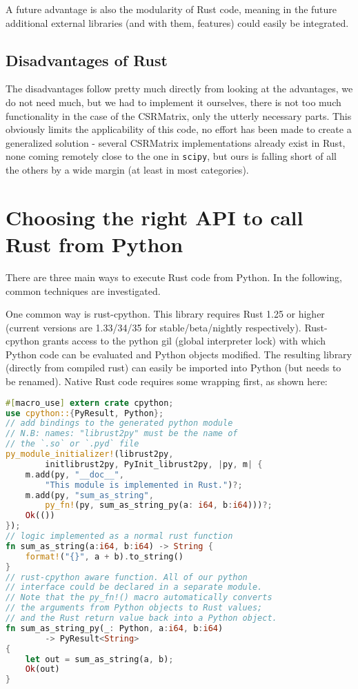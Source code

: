 A future advantage is also the modularity of Rust code, meaning in the future
additional external libraries (and with them, features) could easily be integrated.

\subsection{Disadvantages of Rust}

The disadvantages follow pretty much directly from looking at the advantages,
we do not need much, but we had to implement it ourselves, there is not
too much functionality in the case of the CSRMatrix, only the utterly necessary
parts. This obviously limits the applicability of this code, no effort has been
made to create a generalized solution - several CSRMatrix implementations
already exist in Rust, none coming remotely close to the one in \verb|scipy|,
but ours is falling short of all the others by a wide margin (at least in most
categories).



\section{Choosing the right API to call Rust from Python}\label{sec:api}

There are three main ways to execute Rust code from Python. In the following, common techniques are investigated.

One common way is rust-cpython. This library requires Rust 1.25 or higher
(current versions are 1.33/34/35 for stable/beta/nightly respectively).
Rust-cpython grants access to the python gil (global interpreter lock) with
which Python code can be evaluated and Python objects modified. The resulting
library (directly from compiled rust) can easily be imported into Python (but
needs to be renamed). Native Rust code requires some wrapping first, as shown
here:

\vline
\begin{lstlisting}[language=Rust]
#[macro_use] extern crate cpython;
use cpython::{PyResult, Python};
// add bindings to the generated python module
// N.B: names: "librust2py" must be the name of
// the `.so` or `.pyd` file
py_module_initializer!(librust2py,
        initlibrust2py, PyInit_librust2py, |py, m| {
    m.add(py, "__doc__",
        "This module is implemented in Rust.")?;
    m.add(py, "sum_as_string",
        py_fn!(py, sum_as_string_py(a: i64, b:i64)))?;
    Ok(())
});
// logic implemented as a normal rust function
fn sum_as_string(a:i64, b:i64) -> String {
    format!("{}", a + b).to_string()
}
// rust-cpython aware function. All of our python
// interface could be declared in a separate module.
// Note that the py_fn!() macro automatically converts
// the arguments from Python objects to Rust values;
// and the Rust return value back into a Python object.
fn sum_as_string_py(_: Python, a:i64, b:i64)
        -> PyResult<String>
{
    let out = sum_as_string(a, b);
    Ok(out)
}
\end{lstlisting}
\vline

